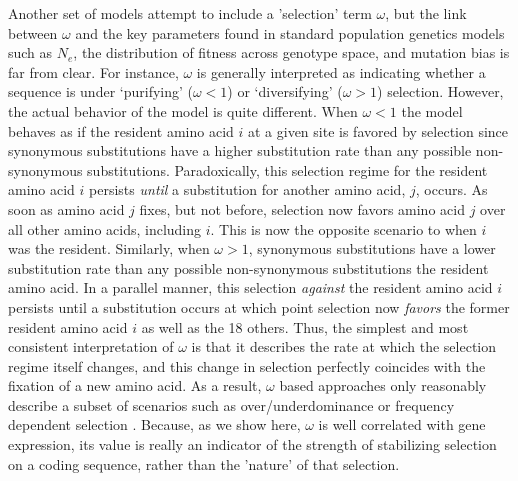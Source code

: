 \documentclass[12pt,letterpaper]{article}
\newcommand{\Ne}{\ensuremath{{N_e}}\xspace} %
\begin{document}
Another set of models attempt to include a 'selection' term $\omega$, but the link between $\omega$ and the key parameters found in standard population genetics models such as \Ne, the distribution of fitness across genotype space, and mutation bias is far from clear.
For instance, $\omega$ is generally interpreted as indicating whether a sequence is under `purifying' ($\omega < 1$) or `diversifying' ($\omega > 1$) selection.
However, the actual behavior of the model is quite different.
When $\omega < 1$ the model behaves as if the resident amino acid $i$ at a given site is favored by selection since synonymous substitutions have a higher substitution rate than any possible non-synonymous substitutions.
Paradoxically, this selection regime for the resident amino acid $i$ persists \emph{until} a substitution for another amino acid, $j$, occurs.
As soon as amino acid $j$ fixes, but not before, selection now favors amino acid $j$ over all other amino acids, including $i$.
This is now the opposite scenario to when $i$ was the resident.
Similarly, when $\omega > 1$, synonymous substitutions have a lower substitution rate than any possible non-synonymous substitutions the resident amino acid.
In a parallel manner, this selection \emph{against} the resident amino acid $i$ persists until a substitution occurs at which point selection now \emph{favors} the former resident amino acid $i$ as well as the 18 others.
Thus, the simplest and most consistent interpretation of $\omega$ is that it describes the rate at which the selection regime itself changes, and this change in selection perfectly coincides with the fixation of a new amino acid.
As a result, $\omega$ based approaches only reasonably describe a subset of scenarios such as over/underdominance or frequency dependent selection \citep{HughesAndNei1988,Nowak2006}.
Because, as we show here, $\omega$ is well correlated with gene expression, its value is really an indicator of the strength of stabilizing selection on a coding sequence, rather than the 'nature' of that selection.
\end{document}
